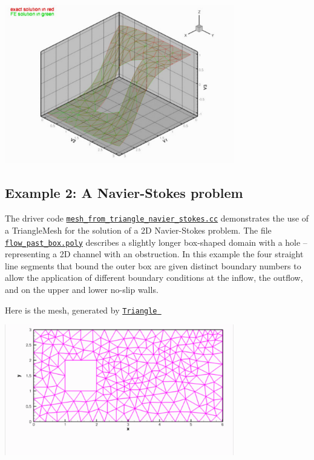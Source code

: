  
\begin{DoxyImage}
\includegraphics[width=0.75\textwidth]{sol_box}
\end{DoxyImage}




 

\hypertarget{index_nst}{}\subsection{Example 2\+: A Navier-\/\+Stokes problem}\label{index_nst}
The driver code \href{../../../../demo_drivers/meshing/mesh_from_triangle/mesh_from_triangle_navier_stokes.cc}{\tt mesh\+\_\+from\+\_\+triangle\+\_\+navier\+\_\+stokes.\+cc} demonstrates the use of a {\ttfamily Triangle\+Mesh} for the solution of a 2D Navier-\/\+Stokes problem. The file \href{../../../../demo_drivers/meshing/mesh_from_triangle/flow_past_box.poly}{\tt flow\+\_\+past\+\_\+box.\+poly} describes a slightly longer box-\/shaped domain with a hole -- representing a 2D channel with an obstruction. In this example the four straight line segments that bound the outer box are given distinct boundary numbers to allow the application of different boundary conditions at the inflow, the outflow, and on the upper and lower no-\/slip walls.

Here is the mesh, generated by \href{http://www.cs.cmu.edu/~quake/triangle.html}{\tt {\ttfamily Triangle} }

 
\begin{DoxyImage}
\includegraphics[width=0.75\textwidth]{box_flow_mesh}
\end{DoxyImage}


